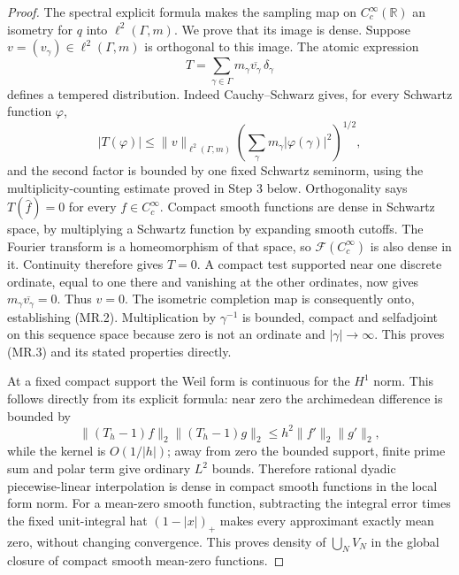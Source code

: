 \begin{proof}
The spectral explicit formula makes the sampling map on
\(C_c^\infty(\mathbb R)\) an isometry for \(q\) into
\(\ell^2(\Gamma,m)\).  We prove that its image is dense.  Suppose
\(v=(v_\gamma)\in\ell^2(\Gamma,m)\) is orthogonal to this image.
The atomic expression
\[
 T=\sum_{\gamma\in\Gamma}m_\gamma\overline{v_\gamma}\,
                                      \delta_\gamma
\]
defines a tempered distribution.  Indeed Cauchy--Schwarz gives,
for every Schwartz function \(\varphi\),
\[
 |T(\varphi)|\le\|v\|_{\ell^2(\Gamma,m)}
       \left(\sum_\gamma m_\gamma|\varphi(\gamma)|^2\right)^{1/2},
\]
and the second factor is bounded by one fixed Schwartz seminorm,
using the multiplicity-counting estimate proved in Step 3 below.
Orthogonality says \(T(\widehat f)=0\) for every
\(f\in C_c^\infty\).  Compact smooth functions are dense in
Schwartz space, by multiplying a Schwartz function by expanding
smooth cutoffs.  The Fourier transform is a homeomorphism of
that space, so \(\mathcal F(C_c^\infty)\) is also dense in it.
Continuity therefore gives \(T=0\).  A compact test supported
near one discrete ordinate, equal to one there and vanishing
at the other ordinates, now gives
\(m_\gamma\overline{v_\gamma}=0\).  Thus \(v=0\).
The isometric completion map is consequently onto, establishing
(MR.2).  Multiplication by \(\gamma^{-1}\) is bounded, compact
and selfadjoint on this sequence space because zero is not an
ordinate and \(|\gamma|\to\infty\).  This proves (MR.3) and its
stated properties directly.

At a fixed compact support the Weil form is continuous for the
\(H^1\) norm.  This follows directly from its explicit formula:
near zero the archimedean difference is bounded by
\[
 \|(T_h-1)f\|_2\|(T_h-1)g\|_2
       \le h^2\|f'\|_2\|g'\|_2,
\]
while the kernel is \(O(1/|h|)\); away from zero the bounded
support, finite prime sum and polar term give ordinary \(L^2\)
bounds.  Therefore rational dyadic piecewise-linear interpolation
is dense in compact smooth functions in the local form norm.
For a mean-zero smooth function, subtracting the integral error
times the fixed unit-integral hat \((1-|x|)_+\) makes every
approximant exactly mean zero, without changing convergence.
This proves density of \(\bigcup_NV_N\) in the global closure
of compact smooth mean-zero functions.


\end{proof}
